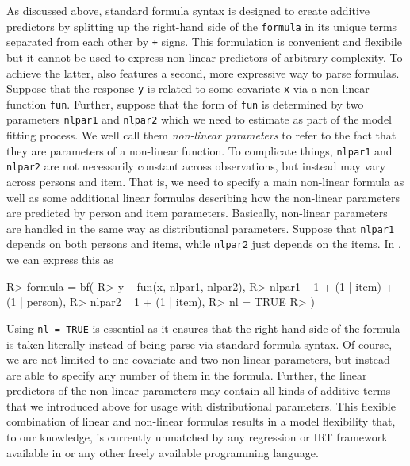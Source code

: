 \documentclass[jss]{jss}
\begin{document}
As discussed above, standard  formula syntax is designed to
create additive predictors by splitting up the right-hand side of the
\texttt{formula} in its unique terms separated from each other by
\texttt{+} signs. This formulation is convenient and flexibile but it
cannot be used to express non-linear predictors of arbitrary complexity.
To achieve the latter,  also features a second, more
expressive way to parse  formulas. Suppose that the response
\texttt{y} is related to some covariate \texttt{x} via a non-linear
function \texttt{fun}. Further, suppose that the form of \texttt{fun} is
determined by two parameters \texttt{nlpar1} and \texttt{nlpar2} which
we need to estimate as part of the model fitting process. We well call
them \emph{non-linear parameters} to refer to the fact that they are
parameters of a non-linear function. To complicate things,
\texttt{nlpar1} and \texttt{nlpar2} are not necessarily constant across
observations, but instead may vary across persons and item. That is, we
need to specify a main non-linear formula as well as some additional
linear formulas describing how the non-linear parameters are predicted
by person and item parameters. Basically, non-linear parameters are
handled in the same way as distributional parameters. Suppose that
\texttt{nlpar1} depends on both persons and items, while \texttt{nlpar2}
just depends on the items. In , we can express this as

\begin{CodeChunk}

\begin{CodeInput}
R> formula = bf(
R>   y ~ fun(x, nlpar1, nlpar2),
R>   nlpar1 ~ 1 + (1 | item) + (1 | person),
R>   nlpar2 ~ 1 + (1 | item),
R>   nl = TRUE
R> )
\end{CodeInput}
\end{CodeChunk}

Using \texttt{nl\ =\ TRUE} is essential as it ensures that the
right-hand side of the formula is taken literally instead of being parse
via standard  formula syntax. Of course, we are not limited
to one covariate and two non-linear parameters, but instead are able to
specify any number of them in the formula. Further, the linear
predictors of the non-linear parameters may contain all kinds of
additive terms that we introduced above for usage with distributional
parameters. This flexible combination of linear and non-linear formulas
results in a model flexibility that, to our knowledge, is currently
unmatched by any regression or IRT framework available in 
or any other freely available programming language.
\end{document}

